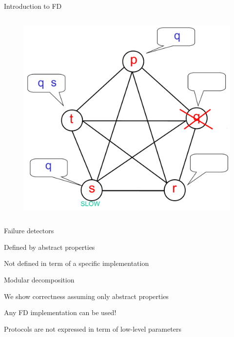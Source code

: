 \begin{frame}{Introduction to FD}
\begin{overprint}
\begin{columns}[t]
\begin{column}{0.35\textwidth}
\begin{figure}
\includegraphics[width=\textwidth]{fd}
\end{figure}

\end{column}
\end{columns}

\end{overprint}
\end{frame}

% 
% 
% 



\begin{frame}{Failure detectors}


\BIL
\item Defined by abstract properties
\BI
\item Not defined in term of a specific implementation
\EI
\item Modular decomposition
\BI
\item We show correctness assuming only abstract properties
\item Any FD implementation can be used!
\item Protocols are not expressed in term of low-level parameters
\EI
\EIL

\end{frame}

